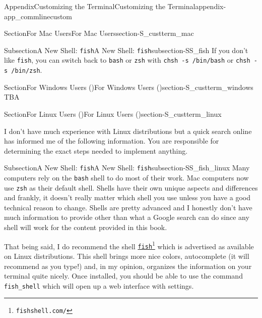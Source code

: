 \documentclass[twoside,10pt,]{book}
\newcommand{\mono}[1]{\texttt{#1}}
\begin{document}
\begin{appendixptx}{Appendix}{Customizing the Terminal}{}{Customizing the Terminal}{}{}{appendix-app_commlinecustom}
\begin{sectionptx}{Section}{For Mac Users}{}{For Mac Users}{}{}{section-S_custterm_mac}
\begin{subsectionptx}{Subsection}{A New Shell: \mono{fish}}{}{A New Shell: \mono{fish}}{}{}{subsection-SS_fish}
If you don't like \mono{fish}, you can switch back to \mono{bash} or \mono{zsh} with \mono{chsh -s /bin/bash} or \mono{chsh -s /bin/zsh}.%
\end{subsectionptx}
\end{sectionptx}
%
%
\typeout{************************************************}
\typeout{************************************************}
%
\begin{sectionptx}{Section}{For Windows Users (\textasteriskcentered{})}{}{For Windows Users (\textasteriskcentered{})}{}{}{section-S_custterm_windows}
%
TBA%
\end{sectionptx}
%
%
\typeout{************************************************}
\typeout{************************************************}
%
\begin{sectionptx}{Section}{For Linux Users (\textasteriskcentered{})}{}{For Linux Users (\textasteriskcentered{})}{}{}{section-S_custterm_linux}
%
\begin{introduction}{}%
I don't have much experience with Linux distributions but a quick search online has informed me of the following information. You are responsible for determining the exact steps needed to implement anything.%
\end{introduction}%
%
%
\typeout{************************************************}
\typeout{Subsection A.3.1 A New Shell: \mono{fish}}
\typeout{************************************************}
%
\begin{subsectionptx}{Subsection}{A New Shell: \mono{fish}}{}{A New Shell: \mono{fish}}{}{}{subsection-SS_fish_linux}
%
%
Many computers rely on the \mono{bash} shell to do most of their work. Mac computers now use \mono{zsh} as their default shell. Shells have their own unique aspects and differences and frankly, it doesn't really matter which shell you use unless you have a good technical reason to change. Shells are pretty advanced and I honestly don't have much information to provide other than what a Google search can do since any shell will work for the content provided in this book.%
\par
That being said, I do recommend the shell \href{https://fishshell.com/}{\mono{fish}}\footnote{\nolinkurl{fishshell.com/}\label{fn-SS_fish_linux-e-b}} which is advertised as available on Linux distributions. This shell brings more nice colors, autocomplete (it will recommend as you type!) and, in my opinion, organizes the information on your terminal quite nicely. Once installed, you should be able to use the command \mono{fish\_shell} which will open up a web interface with settings.%

\end{subsectionptx}
\end{sectionptx}
\end{appendixptx}
\end{document}
